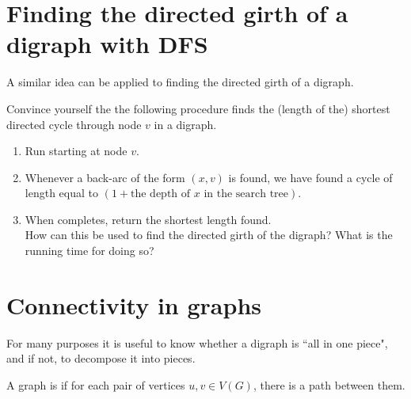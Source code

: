 \section{Finding the directed girth of a digraph with DFS}

A similar idea can be applied to finding the directed girth of a digraph.

\begin{Boxample}[2.5]
Convince yourself the the following procedure finds the (length of the) shortest directed cycle through node $v$ in a digraph.
\begin{enumerate}
\item Run  starting at node $v$.
\item Whenever a back-arc of the form $(x,v)$ is found, we have found a cycle of length equal to $(1 + \mbox{the depth of }x\mbox{ in the search tree})$. 
\item When   completes, return the shortest length found.\\

\vspace{2.5cm}
How can this be used to find the directed girth of the digraph? What is the running time for doing so?
\end{enumerate}
\end{Boxample}

\section{Connectivity in graphs}

For many purposes it is useful to know whether a digraph is ``all in one
piece", and if not, to decompose it into pieces.


\begin{Definition} 
A graph is  if for each pair of 
vertices $u, v \in V(G)$, there is a path between them.
\end{Definition}


